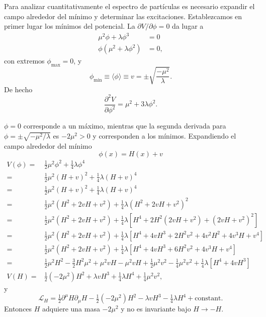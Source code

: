 \begin{frame}
Para analizar cuantitativamente el espectro de partículas es necesario expandir el campo alrededor del mínimo y determinar las excitaciones. Establezcamos en primer lugar los mínimos del potencial. La $\partial V/\partial\phi=0$ da lugar a
\begin{align}
  \mu^2\phi+\lambda\phi^3&=0\\
  \phi(\mu^2+\lambda\phi^2)&=0,
\end{align}
con extremos $\phi_{\text{max}}=0$, y 
\begin{equation}
  \label{eq:90qft}
  \phi_{\text{min}}\equiv\langle\phi\rangle\equiv v=\pm\sqrt{\frac{-\mu^2}{\lambda}}.
\end{equation}
De hecho 
\begin{equation}
  \frac{\partial^2V}{\partial\phi^2}=\mu^2+3\lambda\phi^2.
\end{equation}
\end{frame}
$\phi=0$ corresponde a un máximo, mientras que la segunda derivada para $\phi=\pm\sqrt{-\mu^2/\lambda}$ es $-2\mu^2\gt 0$ y corresponden a los mínimos. Expandiendo el campo alrededor del mínimo
\begin{equation}
  \phi(x)=H(x)+v
\end{equation}
\begin{align}
  V(\phi)=&\tfrac{1}{2}\mu^2 \phi^2+\tfrac{1}{4}\lambda\phi^4\nonumber\\
  =&\tfrac{1}{2}\mu^2 (H+v)^2+\tfrac{1}{4}\lambda(H+v)^4\nonumber\\
  =&\tfrac{1}{2}\mu^2 (H+v)^2+\tfrac{1}{4}\lambda(H+v)^4\nonumber\\
  =&\tfrac{1}{2}\mu^2 \left(H^2+2vH+v^2\right)+\tfrac{1}{4}\lambda\left(H^2+2vH+v^2\right)^2\nonumber\\
  =&\tfrac{1}{2}\mu^2 \left(H^2+2vH+v^2\right)+\tfrac{1}{4}\lambda\left[H^4+2H^2\left(2vH+v^2\right)+\left(2vH+v^2\right)^2\right]\nonumber\\
  =&\tfrac{1}{2}\mu^2 \left(H^2+2vH+v^2\right)+\tfrac{1}{4}\lambda\left[H^4+4vH^3+2H^2v^2+4v^2H^2+4v^3H+v^4\right]\nonumber\\
  =&\tfrac{1}{2}\mu^2 \left(H^2+2vH+v^2\right)+\tfrac{1}{4}\lambda\left[H^4+4vH^3+6H^2v^2+4v^3H+v^4\right]\nonumber\\
  =&\tfrac{1}{2}\mu^2H^2-\tfrac{3}{2}H^2\mu^2+\mu^2vH-\mu^2vH+\tfrac{1}{2}\mu^2v^2-\tfrac{1}{4}\mu^2v^2+\tfrac{1}{4}\lambda\left[H^4+4vH^3\right]\nonumber\\
\label{eq:84qft}
V(H)=&\tfrac{1}{2}\left(-2\mu^2\right)H^2+\lambda vH^3+\tfrac{1}{4}\lambda H^4+\tfrac{1}{4}\mu^2v^2,
\end{align}
y
\begin{equation}
  \label{eq:88qft}
  \mathcal{L}_H=\tfrac{1}{2}\partial^\mu H\partial_\mu H-\tfrac{1}{2}\left(-2\mu^2\right)H^2-\lambda vH^3-\tfrac{1}{4}\lambda H^4+\text{constant}.
\end{equation}
Entonces $H$ adquiere una masa $-2\mu^2$ y no es invariante bajo $H\to-H$. 


